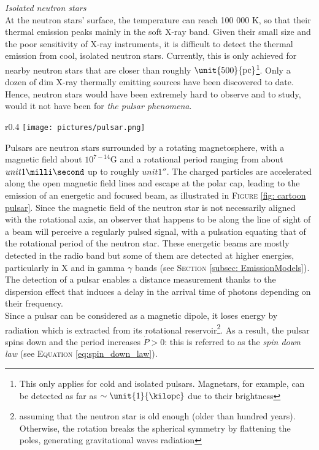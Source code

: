 \documentclass[a4paper, twoside, 12pt]{article}
\numberwithin{equation}{section}
\begin{document}
{\itshape{ Isolated neutron stars }} \\ 


 At the neutron stars' surface, the temperature can reach 100 000 K, so that their thermal emission peaks mainly in the soft X-ray band. Given their small size and the poor sensitivity of X-ray instruments, it is difficult to detect the thermal emission from cool, isolated neutron stars. Currently, this is only achieved for nearby neutron stars that are closer than roughly $\unit{500}{\rm{pc}}$\footnote{This only applies for cold and isolated pulsars. Magnetars, for example, can be detected as far as $\sim \unit{1}{\kilo\rm{pc}}$ due to their brightness}.  Only a dozen of dim X-ray thermally emitting sources have been discovered to date. 
Hence, neutron stars would have been extremely hard to observe and to study, would it not have been for {\itshape{the pulsar phenomena}}. \\ 
\begin{wrapfigure}{r}{0.4\textwidth}
\centering
\texttt{[image: pictures/pulsar.png]}
\caption[Schematic illustration of a pulsar]{Schematic illustration of a pulsating neutron star with the magnetic field lines drawn in dashed and solid lines.}
\label{fig: cartoon pulsar}
\end{wrapfigure}
Pulsars are neutron stars surrounded by a rotating magnetosphere, with a magnetic field about $10^{7-14}$\rm{G} and a rotational period ranging from about $unit{1}{\milli\second}$ up to roughly  $unit{1}{\second}$. The charged particles are accelerated along the open magnetic field lines and escape at the polar cap, leading to the emission of an energetic and focused beam, as illustrated in F\textsc{igure} \ref{fig: cartoon pulsar}. 
Since the magnetic field of the neutron star is not necessarily aligned with the rotational axis, an observer that happens to be along the line of sight of a beam will perceive a regularly pulsed signal, with a pulsation  equating that of the rotational period of the neutron star. These energetic beams are mostly detected in the radio band but some of them are detected at higher energies, particularly in X and in gamma $\gamma$ bands (see S\textsc{ection} \ref{subsec: EmissionModels}). The detection of a pulsar enables a distance measurement thanks to the dispersion effect that induces a delay in the arrival time of photons depending on their frequency. \\

Since a pulsar can be considered as a magnetic dipole, it loses energy by radiation which is extracted from its rotational reservoir\footnote{assuming that the neutron star is old enough (older than hundred years). Otherwise, the rotation breaks the spherical symmetry by flattening the poles, generating gravitational waves radiation}. As a result, the pulsar spins down and the period increases $\dot{P} > 0$: this is referred to as the {\itshape{spin down law}} (see E\textsc{quation} \ref{eq:spin_down_law}).
\end{document}
